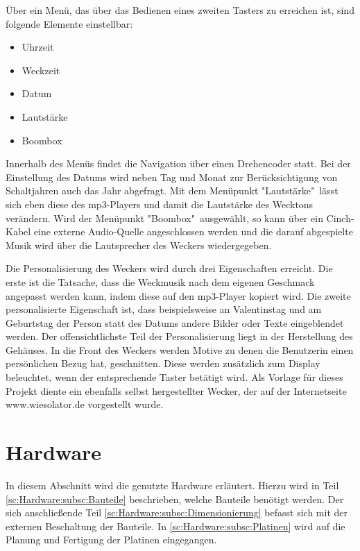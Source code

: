 \documentclass[journal, a4paper]{IEEEtran}
\begin{document}
	Über ein Menü, das über das Bedienen eines zweiten Tasters zu erreichen ist, sind folgende Elemente einstellbar:
	\begin{itemize}[leftmargin=20mm]
	\item Uhrzeit
	\item Weckzeit
	\item Datum
	\item Lautstärke
	\item Boombox
	\end{itemize}
	Innerhalb des Menüs findet die Navigation über einen Drehencoder statt.	Bei der Einstellung des Datums wird neben Tag und Monat zur Berücksichtigung von Schaltjahren auch das Jahr abgefragt. Mit dem Menüpunkt "Lautstärke"\ lässt sich eben diese des mp3-Players und damit die Lautstärke des Wecktons verändern. Wird der Menüpunkt "Boombox"\ ausgewählt, so kann über ein Cinch-Kabel eine externe Audio-Quelle angeschlossen werden und die darauf abgespielte Musik wird über die Lautsprecher des Weckers wiedergegeben.\par
	Die Personalisierung des Weckers wird durch drei Eigenschaften erreicht. Die erste ist die Tatsache, dass die Weckmusik nach dem eigenen Geschmack angepasst werden kann, indem diese auf den mp3-Player kopiert wird. Die zweite personalisierte Eigenschaft ist, dass beispielsweise an Valentinstag und am Geburtstag der Person statt des Datums andere Bilder oder Texte eingeblendet werden. Der offensichtlichste Teil der Personalisierung liegt in der Herstellung des Gehäuses. In die Front des Weckers werden Motive zu denen die Benutzerin einen persönlichen Bezug hat, geschnitten. Diese werden zusätzlich zum Display beleuchtet, wenn der entsprechende Taster betätigt wird.
	Als Vorlage für dieses Projekt diente ein ebenfalls selbst hergestellter Wecker, der auf der Internetseite www.wiesolator.de vorgestellt wurde.\par
	
\section{Hardware}
	In diesem Abschnitt wird die genutzte Hardware erläutert. Hierzu wird in Teil \ref{sc:Hardware:subsc:Bauteile} beschrieben, welche Bauteile benötigt werden. Der sich anschließende Teil \ref{sc:Hardware:subsc:Dimensionierung} befasst sich mit der externen Beschaltung der Bauteile. In \ref{sc:Hardware:subsc:Platinen} wird auf die Planung und Fertigung der Platinen eingegangen.
\end{document}
